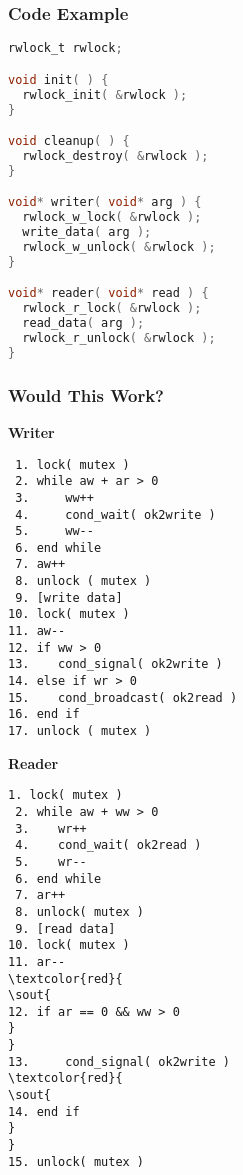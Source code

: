 \begin{frame}[fragile]
	\frametitle{Code Example}

	\begin{center}
		\begin{lstlisting}[language=C]
rwlock_t rwlock;

void init( ) {
  rwlock_init( &rwlock );
}

void cleanup( ) {
  rwlock_destroy( &rwlock );
}

void* writer( void* arg ) {
  rwlock_w_lock( &rwlock );
  write_data( arg );
  rwlock_w_unlock( &rwlock );
}

void* reader( void* read ) {
  rwlock_r_lock( &rwlock );
  read_data( arg );
  rwlock_r_unlock( &rwlock );
}
		\end{lstlisting}
	\end{center}
\end{frame}

\begin{frame}[fragile]
	\frametitle{Would This Work?}

	\begin{multicols}{2}
		\small
		\textbf{Writer}
		\begin{verbatim}
 1. lock( mutex )
 2. while aw + ar > 0
 3.     ww++
 4.     cond_wait( ok2write )
 5.     ww--
 6. end while
 7. aw++
 8. unlock ( mutex )
 9. [write data]
10. lock( mutex )
11. aw--
12. if ww > 0
13.    cond_signal( ok2write )
14. else if wr > 0
15.    cond_broadcast( ok2read )
16. end if
17. unlock ( mutex )
		\end{verbatim}
		\columnbreak
		\textbf{Reader}
		\begin{Verbatim}[commandchars=\\\{\}]
 1. lock( mutex )
 2. while aw + ww > 0
 3.    wr++
 4.    cond_wait( ok2read )
 5.    wr--
 6. end while
 7. ar++
 8. unlock( mutex )
 9. [read data]
10. lock( mutex )
11. ar--
\textcolor{red}{
\sout{
12. if ar == 0 && ww > 0
}
}
13.     cond_signal( ok2write )
\textcolor{red}{
\sout{
14. end if
}
}
15. unlock( mutex )


		\end{Verbatim}
	\end{multicols}
	\vspace{-2em}
\end{frame}


